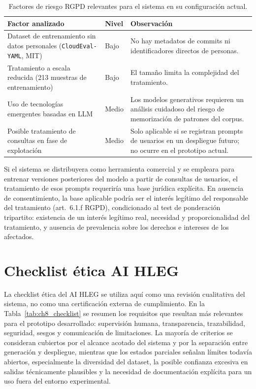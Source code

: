 \begin{table}[htbp]
\centering
\caption{Factores de riesgo RGPD relevantes para el sistema en su configuración actual.}
\label{tab:ch8_rgpd_factors}
\begin{tabular}{p{}p{}p{}}
\toprule
\textbf{Factor analizado} & \textbf{Nivel} & \textbf{Observación} \\
\midrule
Dataset de entrenamiento sin datos personales
    (\texttt{CloudEval-YAML}, MIT) &
    Bajo &
    No hay metadatos de commits ni identificadores directos de personas. \\
Tratamiento a escala reducida
    (213 muestras de entrenamiento) &
    Bajo &
    El tamaño limita la complejidad del tratamiento. \\
Uso de tecnologías emergentes basadas en LLM &
    Medio &
    Los modelos generativos requieren un análisis cuidadoso del riesgo de
    memorización de patrones del corpus. \\
Posible tratamiento de consultas en fase de explotación &
    Medio &
    Solo aplicable si se registran prompts de usuarios en un despliegue futuro;
    no ocurre en el prototipo actual. \\
\bottomrule
\end{tabular}
\end{table}

Si el sistema se distribuyera como herramienta comercial y se empleara para entrenar versiones
posteriores del modelo a partir de consultas de usuarios, el tratamiento de esos prompts
requeriría una base jurídica explícita. En ausencia de consentimiento, la base aplicable podría
ser el interés legítimo del responsable del tratamiento (art.~6.1.f RGPD), condicionado al test
de ponderación tripartito: existencia de un interés legítimo real, necesidad y proporcionalidad
del tratamiento, y ausencia de prevalencia sobre los derechos e intereses de los afectados.

\section{Checklist ética AI HLEG}

La checklist ética del AI HLEG se utiliza aquí como una revisión cualitativa del sistema,
no como una certificación externa de cumplimiento. En la
Tabla~\ref{tab:ch8_checklist} se resumen los requisitos que resultan más relevantes para
el prototipo desarrollado: supervisión humana, transparencia, trazabilidad, seguridad,
sesgos y comunicación de limitaciones. La mayoría de criterios se consideran cubiertos
por el alcance acotado del sistema y por la separación entre generación y despliegue,
mientras que los estados parciales señalan límites todavía abiertos, especialmente la
diversidad del dataset, la posible confianza excesiva en salidas técnicamente plausibles
y la necesidad de documentación explícita para un uso fuera del entorno experimental.

